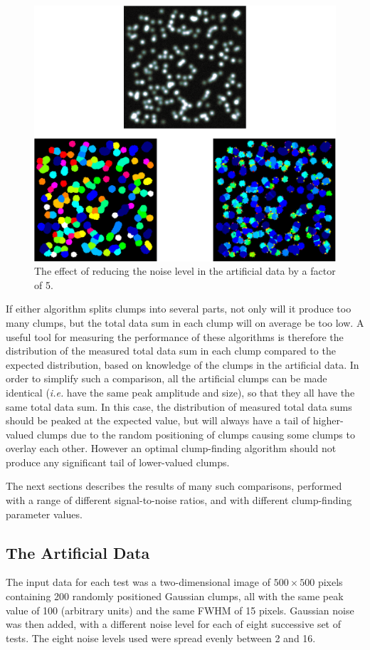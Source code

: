 \documentclass[final,authoryear,5p,times,twocolumn]{elsarticle}
\begin{document}
\begin{figure}
\includegraphics[width=\columnwidth]{comp2}
\caption{The effect of reducing the noise level in the artificial data
by a factor of 5.}
\label{fig:comp2}
\end{figure}

If either algorithm splits clumps into several parts, not only will it
produce too many clumps, but the total data sum in each clump will on
average be too low. A useful tool for measuring the performance of these
algorithms is therefore the distribution of the measured total data sum
in each clump compared to the expected distribution, based on knowledge
of the clumps in the artificial data. In order to simplify such a
comparison, all the artificial clumps can be made identical (\emph{i.e.}
have the same peak amplitude and size), so that they all have the same
total data sum. In this case, the distribution of measured total data
sums should be peaked at the expected value, but will always have a tail
of higher-valued clumps due to the random positioning of clumps causing
some clumps to overlay each other. However an optimal clump-finding
algorithm should not produce any significant tail of lower-valued clumps.

The next sections describes the results of many such comparisons,
performed with a range of different signal-to-noise ratios, and with
different clump-finding parameter values.

\subsection{The Artificial Data}
The input data for each test was a two-dimensional image of $500\times500$
pixels containing 200 randomly positioned Gaussian clumps, all with the
same peak value of 100 (arbitrary units) and the same FWHM of 15 pixels.
Gaussian noise was then added, with a different noise level for each of
eight successive set of tests. The eight noise levels used were
spread evenly between 2 and 16.
\end{document}
